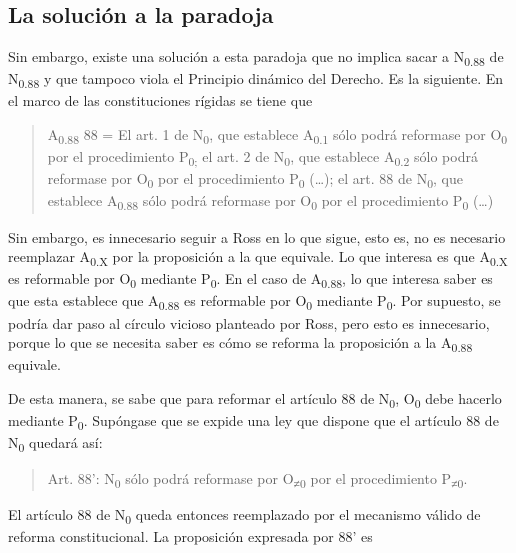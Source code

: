 \documentclass[]{book}
\begin{document}
\begin{refsection}
\section*{La solución a la paradoja}

Sin embargo, existe una solución a esta paradoja que no implica sacar a
N\textsubscript{0.88} de N\textsubscript{0.88} y que tampoco viola el Principio dinámico del Derecho. Es la siguiente. En el marco de las
constituciones rígidas se tiene que

\begin{quote}
A\textsubscript{0.88} 88 = El art. 1 de N\textsubscript{0}, que
establece A\textsubscript{0.1} sólo podrá reformase por
O\textsubscript{0} por el procedimiento P\textsubscript{0;} el art. 2 de
N\textsubscript{0}, que establece A\textsubscript{0.2} sólo podrá
reformase por O\textsubscript{0} por el procedimiento P\textsubscript{0}
(\ldots{}); el art. 88 de N\textsubscript{0}, que establece
A\textsubscript{0.88} sólo podrá reformase por O\textsubscript{0} por el
procedimiento P\textsubscript{0} (\ldots{})
\end{quote}

Sin embargo, es innecesario seguir a Ross en lo que sigue, esto es, no
es necesario reemplazar A\textsubscript{0.X} por la proposición a la que
equivale. Lo que interesa es que A\textsubscript{0.X} es reformable por
O\textsubscript{0} mediante P\textsubscript{0}. En el caso de
A\textsubscript{0.88}, lo que interesa saber es que esta establece que
A\textsubscript{0.88} es reformable por O\textsubscript{0} mediante
P\textsubscript{0}. Por supuesto, se podría dar paso al círculo vicioso
planteado por Ross, pero esto es innecesario, porque lo que se necesita
saber es cómo se reforma la proposición a la A\textsubscript{0.88}
equivale.

De esta manera, se sabe que para reformar el artículo 88 de
N\textsubscript{0}, O\textsubscript{0} debe hacerlo mediante
P\textsubscript{0}. Supóngase que se expide una ley que dispone que el
artículo 88 de N\textsubscript{0} quedará así:

\begin{quote}
Art. 88': N\textsubscript{0} sólo podrá reformase por
O\textsubscript{≠0} por el procedimiento P\textsubscript{≠0}.
\end{quote}

El artículo 88 de N\textsubscript{0} queda entonces reemplazado por el
mecanismo válido de reforma constitucional. La proposición expresada por
88' es


\end{refsection}
\end{document}
